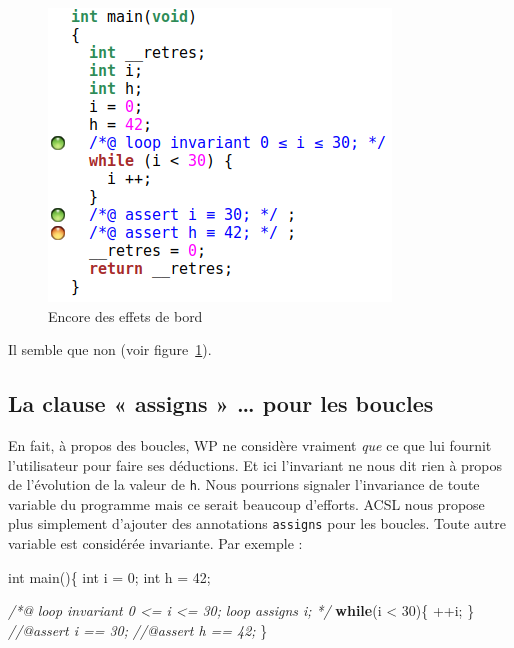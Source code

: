 \documentclass[12pt,francais,]{scrbook}
\newenvironment{Shaded}{}{}
\newcommand{\KeywordTok}[1]{\textcolor[rgb]{0.00,0.44,0.13}{\textbf{{#1}}}}
\newcommand{\DataTypeTok}[1]{\textcolor[rgb]{0.56,0.13,0.00}{{#1}}}
\newcommand{\DecValTok}[1]{\textcolor[rgb]{0.25,0.63,0.44}{{#1}}}
\newcommand{\CommentTok}[1]{\textcolor[rgb]{0.38,0.63,0.69}{\textit{{#1}}}}
\newcommand{\NormalTok}[1]{{#1}}
\begin{document}
\begin{figure}[htbp]
\centering
\includegraphics[scale=0.5]{3-3-boucle-effet-bord.png}
\caption{Encore des effets de bord}
\label{fig:3-3-loop-side-effect}
\end{figure}

Il semble que non (voir figure~\ref{fig:3-3-loop-side-effect}).

\subsection{La clause « assigns » \ldots{} pour les
boucles}\label{la-clause-assigns-pour-les-boucles}

En fait, à propos des boucles, WP ne considère vraiment \emph{que} ce
que lui fournit l'utilisateur pour faire ses déductions. Et ici
l'invariant ne nous dit rien à propos de l'évolution de la valeur de
\texttt{h}. Nous pourrions signaler l'invariance de toute variable du
programme mais ce serait beaucoup d'efforts. ACSL nous propose plus
simplement d'ajouter des annotations \texttt{assigns} pour les boucles.
Toute autre variable est considérée invariante. Par exemple :

\begin{footnotesize}\begin{Shaded}
\begin{Highlighting}[]
\DataTypeTok{int} \NormalTok{main()\{}
  \DataTypeTok{int} \NormalTok{i = }\DecValTok{0}\NormalTok{;}
  \DataTypeTok{int} \NormalTok{h = }\DecValTok{42}\NormalTok{;}
  
  \CommentTok{/*@}
\CommentTok{    loop invariant 0 <= i <= 30;}
\CommentTok{    loop assigns i;}
\CommentTok{  */}
  \KeywordTok{while}\NormalTok{(i < }\DecValTok{30}\NormalTok{)\{}
    \NormalTok{++i;}
  \NormalTok{\}}
  \CommentTok{//@assert i == 30;}
  \CommentTok{//@assert h == 42;}
\NormalTok{\}}
\end{Highlighting}
\end{Shaded}\end{footnotesize}
\end{document}
